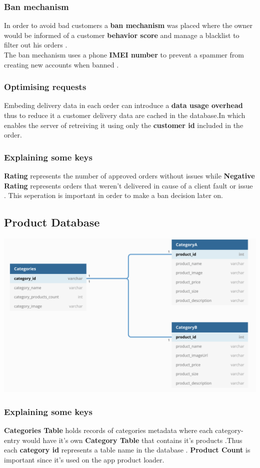 \documentclass{article}
\begin{document}
\subsubsection{Ban mechanism}
In order to avoid bad customers a \textbf{ban mechanism} was placed where the owner would be informed of a customer \textbf{behavior score} and manage a blacklist to filter out his orders .\\
The ban mechanism uses a phone \textbf{IMEI number} to prevent a spammer from creating new accounts when banned .
\subsubsection{Optimising requests}
Embeding delivery data in each order can introduce a \textbf{data usage overhead} thus to reduce it a customer delivery data are cached in the database.In which enables the server of retreiving it using only the \textbf{customer id} included in the order. 
\subsubsection{Explaining some keys}
\textbf{Rating} represents the number of approved orders without issues while \textbf{Negative Rating} represents orders that weren't delivered in cause of a client fault or issue . This seperation is important in order to make a ban decision later on.

\subsection{Product Database}
\includegraphics[scale=0.3]{./out/NodeApp/Database/ProductsTable.png}
\subsubsection{Explaining some keys}
\textbf{Categories Table } holds records of categories metadata where each category-entry would have it's own \textbf{Category Table} that contains it's products .Thus each \textbf{category id} represents a table name in the database .\newline
\textbf{Product Count} is important since it's used on the app product loader.
\end{document}
